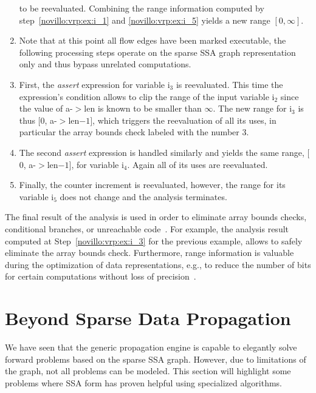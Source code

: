 \begin{enumerate}
      to be reevaluated. Combining the range information computed by
      step~\ref{novillo:vrp:ex:i_1} and \ref{novillo:vrp:ex:i_5} yields a new
      range $[0, \infty]$.
\item Note that at this point all flow edges have been marked executable, the
      following processing steps operate on the sparse SSA graph representation
      only and thus bypass unrelated computations.
\item \label{novillo:vrp:ex:i_3} First, the \emph{assert} expression for
      variable i$_3$ is reevaluated. This time the expression's condition allows
      to clip the range of the input variable i$_2$ since the value of a-$>$len
      is known to be smaller than $\infty$. The new range for i$_3$ is thus
      $[$0, a-$>$len$ - 1]$, which triggers the reevaluation of all its uses,
      in particular the array bounds check labeled with the number $3$.
\item The second \emph{assert} expression is handled similarly and yields the
      same range, $[$0, a-$>$len$ - 1]$, for variable i$_4$. Again all of its
      uses are reevaluated.
\item Finally, the counter increment is reevaluated, however, the range for its
      variable i$_5$ does not change and the analysis terminates.

\end{enumerate}

The final result of the analysis is used in order to eliminate array bounds
checks, conditional branches, or unreachable code~\cite{novillo:bib:BGV00}. For
example, the analysis result computed at Step~\ref{novillo:vrp:ex:i_3} for the
previous example, allows to safely eliminate the array bounds check.
Furthermore, range information is valuable during the optimization of data
representations, e.g., to reduce the number of bits for certain computations
without loss of precision~\cite{novillo:bib:SBA00}.


\section{Beyond Sparse Data Propagation}
\label{novillo:sec:beyond_sparse_data_propagation}

We have seen that the generic propagation engine is capable to elegantly solve
forward problems based on the sparse SSA graph. However, due to limitations of
the graph, not all problems can be modeled.  This section will highlight some
problems where SSA form has proven helpful using specialized algorithms.

